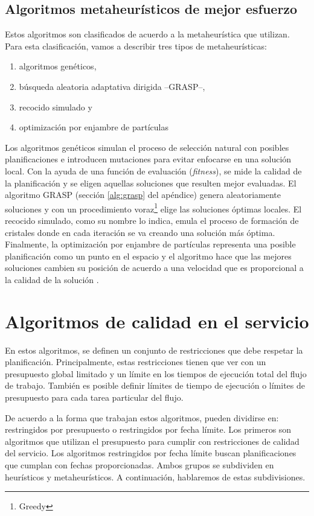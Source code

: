 \subsection{Algoritmos metaheurísticos de mejor esfuerzo}

Estos algoritmos son clasificados de acuerdo a la metaheurística que utilizan. Para esta clasificación, vamos a describir tres tipos de metaheurísticas: 

\begin{enumerate}
\item{algoritmos genéticos,}
\item{búsqueda aleatoria adaptativa dirigida --GRASP--,}
\item{recocido simulado y}
\item{optimización por enjambre de partículas}
\end{enumerate}

Los algoritmos genéticos simulan el proceso de selección natural con posibles planificaciones e introducen mutaciones para evitar enfocarse en una solución local. Con la ayuda de una función de evaluación (\emph{fitness}), se mide la calidad de la planificación y se eligen aquellas soluciones que resulten mejor evaluadas. El algoritmo GRASP (sección \ref{alg:grasp} del apéndice) genera aleatoriamente soluciones y con un procedimiento voraz\footnote{Greedy} elige las soluciones óptimas locales. El recocido simulado, como su nombre lo indica, emula el proceso de formación de cristales donde en cada iteración se va creando una solución más óptima. Finalmente, la optimización por enjambre de partículas representa una posible planificación como un punto en el espacio y el algoritmo hace que las mejores soluciones cambien su posición de acuerdo a una velocidad que es proporcional a la calidad de la solución \cite{wu2010revised}.

\section{Algoritmos de calidad en el servicio}
En estos algoritmos, se definen un conjunto de restricciones que debe respetar la planificación. Principalmente, estas restricciones tienen que ver con un presupuesto global limitado y un límite en los tiempos de ejecución total del flujo de trabajo. También es posible definir límites de tiempo de ejecución o límites de presupuesto para cada tarea particular del flujo.

De acuerdo a la forma que trabajan estos algoritmos, pueden dividirse en: restringidos por presupuesto o restringidos por fecha límite. Los primeros son algoritmos que utilizan el presupuesto para cumplir con restricciones de calidad del servicio. Los algoritmos restringidos por fecha límite buscan planificaciones que cumplan con fechas proporcionadas. Ambos grupos se subdividen en heurísticos y metaheurísticos. A continuación, hablaremos de estas subdivisiones.

